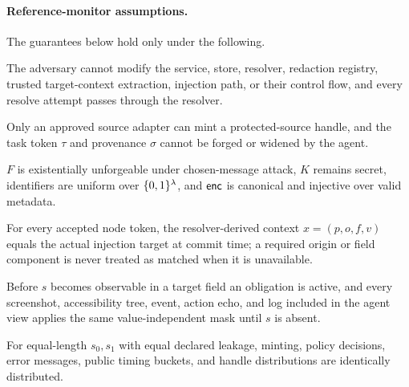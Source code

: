 \paragraph{Reference-monitor assumptions.} The guarantees below hold only under the following.

\begin{assumption}
\label{ass:tcb}
The adversary cannot modify the \SH{} service, store, resolver, redaction registry, trusted target-context extraction, injection path, or their control flow, and every resolve attempt passes through the resolver.
\end{assumption}

\begin{assumption}
\label{ass:source}
Only an approved source adapter can mint a protected-source handle, and the task token $\tau$ and provenance $\sigma$ cannot be forged or widened by the agent.
\end{assumption}

\begin{assumption}
\label{ass:crypto}
$F$ is existentially unforgeable under chosen-message attack, $K$ remains secret, identifiers are uniform over $\{0,1\}^\lambda$, and $\mathsf{enc}$ is canonical and injective over valid metadata.
\end{assumption}

\begin{assumption}
\label{ass:identity}
For every accepted node token, the resolver-derived context $x=(p,o,f,v)$ equals the actual injection target at commit time; a required origin or field component is never treated as matched when it is unavailable.
\end{assumption}

\begin{assumption}
\label{ass:redaction}
Before $s$ becomes observable in a target field an obligation is active, and every screenshot, accessibility tree, event, action echo, and log included in the agent view applies the same value-independent mask until $s$ is absent.
\end{assumption}

\begin{assumption}
\label{ass:oblivious}
For equal-length $s_0,s_1$ with equal declared leakage, minting, policy decisions, error messages, public timing buckets, and handle distributions are identically distributed.
\end{assumption}

